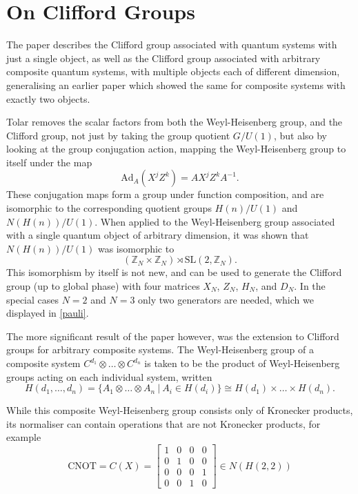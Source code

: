 \section{On Clifford Groups}\label{tolar-cliff}
The paper \cite{tolar-clifford} describes the Clifford group associated with quantum systems with just a single object, as well as the Clifford group associated with arbitrary composite quantum systems, with multiple objects each of different dimension, generalising an earlier paper \cite{tolar-symmetries} which showed the same for composite systems with exactly two objects.

Tolar removes the scalar factors from both the Weyl-Heisenberg group, and the Clifford group, not just by taking the group quotient $G/U(1)$, but also by looking at the group conjugation action, mapping the Weyl-Heisenberg group to itself under the map
\[\text{Ad}_A(X^jZ^k) = AX^jZ^kA^{-1}.\]
These conjugation maps form a group under function composition, and are isomorphic to the corresponding quotient groups $H(n)/U(1)$ and $N(H(n))/U(1)$. When applied to the Weyl-Heisenberg group associated with a single quantum object of arbitrary dimension, it was shown that $N(H(n))/U(1)$ was isomorphic to
\[(\mathbb{Z}_N\times\mathbb{Z}_N)\rtimes\text{SL}(2,\mathbb{Z}_N).\]
This isomorphism by itself is not new, and can be used to generate the Clifford group (up to global phase) with four matrices $X_N$, $Z_N$,  $H_N$, and $D_N$. In the special cases $N=2$ and $N=3$ only two generators are needed, which we displayed in \autoref{pauli}. 

The more significant result of the paper however, was the extension to Clifford groups for arbitrary composite systems. The Weyl-Heisenberg group of a composite system $C^{d_1}\otimes \dots \otimes C^{d_n}$ is taken to be the product of Weyl-Heisenberg groups acting on each individual system, written
\[H(d_1, \dots, d_n) = \{A_1 \otimes \dots \otimes A_n\ |\ A_i \in H(d_i)\} \cong H(d_1) \times \dots \times H(d_n).\]

While this composite Weyl-Heisenberg group consists only of Kronecker products, its normaliser can contain operations that are not Kronecker products, for example
\[\text{CNOT} = C(X) = \left[\begin{matrix}
	1 & 0 & 0 & 0 \\
	0 & 1 & 0 & 0 \\
	0 & 0 & 0 & 1 \\
	0 & 0 & 1 & 0
\end{matrix}\right] \in N(H(2, 2))\]

